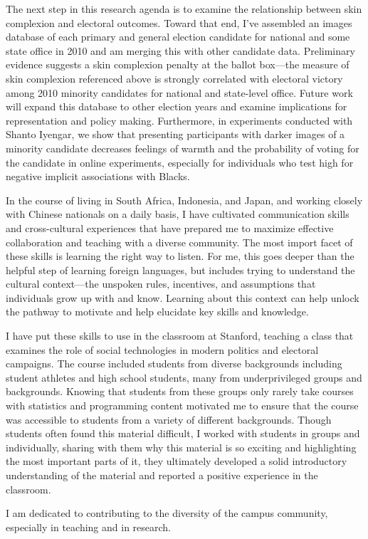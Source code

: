 \documentclass[12pt]{article}
\begin{document}
The next step in this research agenda is to examine the relationship between skin complexion and electoral outcomes.  Toward that end, I've assembled an images database of each primary and general election candidate for national and some state office in 2010 and am merging this with other candidate data.  Preliminary evidence suggests a skin complexion penalty at the ballot box---the measure of skin complexion referenced above is strongly correlated with electoral victory among 2010 minority candidates for national and state-level office.  Future work will expand this database to other election years and examine implications for representation and policy making.  Furthermore, in experiments conducted with Shanto Iyengar, we show that presenting participants with darker images of a minority candidate decreases feelings of warmth and the probability of voting for the candidate in online experiments, especially for individuals who test high for negative implicit associations with Blacks.

In the course of living in South Africa, Indonesia, and Japan, and working closely with Chinese nationals on a daily basis, I have cultivated communication skills and cross-cultural experiences that have prepared me to maximize effective collaboration and teaching with a diverse community.  The most import facet of these skills is learning the right way to listen.  For me, this goes deeper than the helpful step of learning foreign languages, but includes trying to understand the cultural context---the unspoken rules, incentives, and assumptions that individuals grow up with and know.  Learning about this context can help unlock the pathway to motivate and help elucidate key skills and knowledge.

I have put these skills to use in the classroom at Stanford, teaching a class that examines the role of social technologies in modern politics and electoral campaigns.  The course included students from diverse backgrounds including student athletes and high school students, many from underprivileged groups and backgrounds.  Knowing that students from these groups only rarely take courses with statistics and programming content motivated me to ensure that the course was accessible to students from a variety of different backgrounds.  Though students often found this material difficult, I worked with students in groups and individually, sharing with them why this material is so exciting and highlighting the most important parts of it, they ultimately developed a solid introductory understanding of the material and reported a positive experience in the classroom. 

I am dedicated to contributing to the diversity of the campus community, especially in teaching and in research.  




\end{document}
